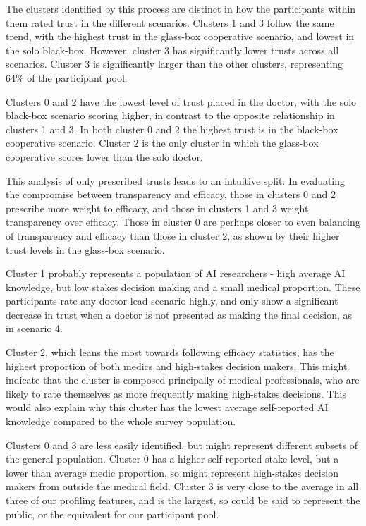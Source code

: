 \documentclass[manuscript,screen,review]{acmart}
\begin{document}
The clusters identified by this process are distinct in how the participants within them rated trust in the different scenarios. Clusters 1 and 3 follow the same trend, with the highest trust in the glass-box cooperative scenario, and lowest in the solo black-box. However, cluster 3 has significantly lower trusts across all scenarios. Cluster 3 is significantly larger than the other clusters, representing 64\% of the participant pool.

Clusters 0 and 2 have the lowest level of trust placed in the doctor, with the solo black-box scenario scoring higher, in contrast to the opposite relationship in clusters 1 and 3. In both cluster 0 and 2 the highest trust is in the black-box cooperative scenario. Cluster 2 is the only cluster in which the glass-box cooperative scores lower than the solo doctor.

This analysis of only prescribed trusts leads to an intuitive split: In evaluating the compromise between transparency and efficacy, those in clusters 0 and 2 prescribe more weight to efficacy, and those in clusters 1 and 3 weight transparency over efficacy. Those in cluster 0 are perhaps closer to even balancing of transparency and efficacy than those in cluster 2, as shown by their higher trust levels in the glass-box scenario.

Cluster 1 probably represents a population of AI researchers - high average AI knowledge, but low stakes decision making and a small medical proportion. These participants rate any doctor-lead scenario highly, and only show a significant decrease in trust when a doctor is not presented as making the final decision, as in scenario 4.

Cluster 2, which leans the most towards following efficacy statistics, has the highest proportion of both medics and high-stakes decision makers. This might indicate that the cluster is composed principally of medical professionals, who are likely to rate themselves as more frequently making high-stakes decisions. This would also explain why this cluster has the lowest average self-reported AI knowledge compared to the whole survey population.

Clusters 0 and 3 are less easily identified, but might represent different subsets of the general population. Cluster 0 has a higher self-reported stake level, but a lower than average medic proportion, so might represent high-stakes decision makers from outside the medical field. Cluster 3 is very close to the average in all three of our profiling features, and is the largest, so could be said to represent the public, or the equivalent for our participant pool.
\end{document}
